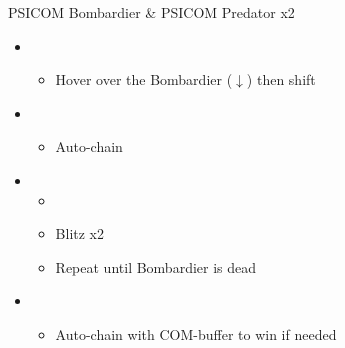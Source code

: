 \begin{battle}{PSICOM Bombardier \& PSICOM Predator x2}
\begin{itemize}
    \item \first
    \begin{itemize}
        \item Hover over the Bombardier ($\downarrow$) then shift
    \end{itemize}
    \item \second
    \begin{itemize}
        \item Auto-chain
    \end{itemize}
    \item \first
    \begin{itemize}
        \item \stagger
        \item Blitz x2
        \item Repeat until Bombardier is dead
    \end{itemize}
    \item \second
    \begin{itemize}
        \item Auto-chain with COM-buffer to win if needed
    \end{itemize}
\end{itemize}
 
\end{battle}


